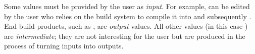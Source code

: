 Some values must be provided by the user as \emph{input}. For example,
 can be edited by the user who relies on the build system to
compile it into  and subsequently . End build products,
such as , are \emph{output} values. All other values (in this case
) are \emph{intermediate}; they are not interesting for the user
but are produced in the process of turning inputs into outputs.
